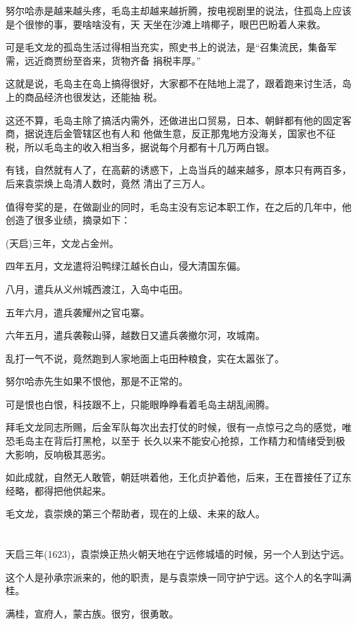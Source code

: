 \documentclass[11pt,a4paper,onecolumn]{article}
\begin{document}
努尔哈赤是越来越头疼，毛岛主却越来越折腾，按电视剧里的说法，住孤岛上应该是个很惨的事，要啥啥没有，天
天坐在沙滩上啃椰子，眼巴巴盼着人来救。

可是毛文龙的孤岛生活过得相当充实，照史书上的说法，是``召集流民，集备军需，远近商贾纷至沓来，货物齐备
捐税丰厚。''

这就是说，毛岛主在岛上搞得很好，大家都不在陆地上混了，跟着跑来讨生活，岛上的商品经济也很发达，还能抽
税。

这还不算，毛岛主除了搞活内需外，还做进出口贸易，日本、朝鲜都有他的固定客商，据说连后金管辖区也有人和
他做生意，反正那鬼地方没海关，国家也不征税，所以毛岛主的收入相当多，据说每个月都有十几万两白银。

有钱，自然就有人了，在高薪的诱惑下，上岛当兵的越来越多，原本只有两百多，后来袁崇焕上岛清人数时，竟然
清出了三万人。

值得夸奖的是，在做副业的同时，毛岛主没有忘记本职工作，在之后的几年中，他创造了很多业绩，摘录如下：

(天启)三年，文龙占金州。

四年五月，文龙遣将沿鸭绿江越长白山，侵大清国东偏。

八月，遣兵从义州城西渡江，入岛中屯田。

五年六月，遣兵袭耀州之官屯寨。

六年五月，遣兵袭鞍山驿，越数日又遣兵袭撤尔河，攻城南。

乱打一气不说，竟然跑到人家地面上屯田种粮食，实在太嚣张了。

努尔哈赤先生如果不恨他，那是不正常的。

可是恨也白恨，科技跟不上，只能眼睁睁看着毛岛主胡乱闹腾。

拜毛文龙同志所赐，后金军队每次出去打仗的时候，很有一点惊弓之鸟的感觉，唯恐毛岛主在背后打黑枪，以至于
长久以来不能安心抢掠，工作精力和情绪受到极大影响，反响极其恶劣。

如此成就，自然无人敢管，朝廷哄着他，王化贞护着他，后来，王在晋接任了辽东经略，都得把他供起来。

毛文龙，袁崇焕的第三个帮助者，现在的上级、未来的敌人。

\section[\thesection]{}

天启三年(1623)，袁崇焕正热火朝天地在宁远修城墙的时候，另一个人到达宁远。

这个人是孙承宗派来的，他的职责，是与袁崇焕一同守护宁远。这个人的名字叫满桂。

满桂，宣府人，蒙古族。很穷，很勇敢。
\end{document}
